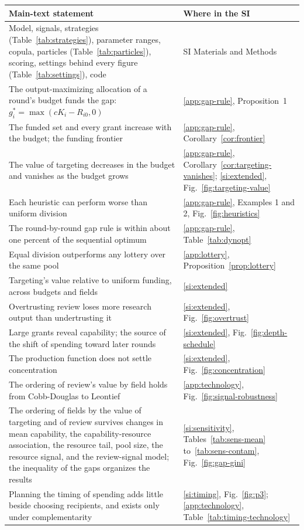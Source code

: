 \documentclass[9pt,twocolumn,twoside]{pnas-new}
\begin{document}
\begin{center}
\small
\begin{tabular}{@{}p{8.4cm}p{4.6cm}@{}}
\toprule
Main-text statement & Where in the SI \\
\midrule
Model, signals, strategies (Table~\ref{tab:strategies}), parameter ranges, copula, particles (Table~\ref{tab:particles}), scoring, settings behind every figure (Table~\ref{tab:settings}), code & SI Materials and Methods \\
The output-maximizing allocation of a round's budget funds the gap: $g_i^* = \max(cK_i - R_{i0}, 0)$ & \ref{app:gap-rule}, Proposition~1 \\
The funded set and every grant increase with the budget; the funding frontier & \ref{app:gap-rule}, Corollary~\ref{cor:frontier} \\
The value of targeting decreases in the budget and vanishes as the budget grows & \ref{app:gap-rule}, Corollary~\ref{cor:targeting-vanishes}; \ref{si:extended}, Fig.~\ref{fig:targeting-value} \\
Each heuristic can perform worse than uniform division & \ref{app:gap-rule}, Examples 1 and 2, Fig.~\ref{fig:heuristics} \\
The round-by-round gap rule is within about one percent of the sequential optimum & \ref{app:gap-rule}, Table~\ref{tab:dynopt} \\
Equal division outperforms any lottery over the same pool & \ref{app:lottery}, Proposition~\ref{prop:lottery} \\
Targeting's value relative to uniform funding, across budgets and fields & \ref{si:extended} \\
Overtrusting review loses more research output than undertrusting it & \ref{si:extended}, Fig.~\ref{fig:overtrust} \\
Large grants reveal capability; the source of the shift of spending toward later rounds & \ref{si:extended}, Fig.~\ref{fig:depth-schedule} \\
The production function does not settle concentration & \ref{si:extended}, Fig.~\ref{fig:concentration} \\
The ordering of review's value by field holds from Cobb-Douglas to Leontief & \ref{app:technology}, Fig.~\ref{fig:signal-robustness} \\
The ordering of fields by the value of targeting and of review survives changes in mean capability, the capability-resource association, the resource tail, pool size, the resource signal, and the review-signal model; the inequality of the gaps organizes the results & \ref{si:sensitivity}, Tables~\ref{tab:sens-mean} to~\ref{tab:sens-contam}, Fig.~\ref{fig:gap-gini} \\
Planning the timing of spending adds little beside choosing recipients, and exists only under complementarity & \ref{si:timing}, Fig.~\ref{fig:p3}; \ref{app:technology}, Table~\ref{tab:timing-technology} \\
\bottomrule
\end{tabular}
\end{center}








\end{document}
